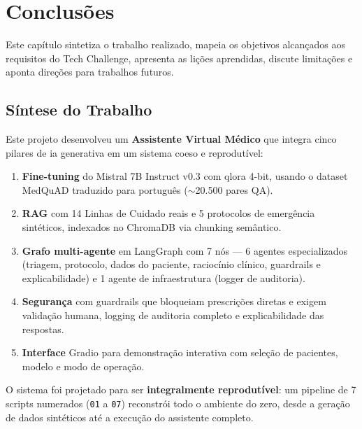 
\chapter{Conclusões}
\label{cap:conclusoes}

Este capítulo sintetiza o trabalho realizado, mapeia os objetivos alcançados aos requisitos do Tech Challenge, apresenta as lições aprendidas, discute limitações e aponta direções para trabalhos futuros.

\section{Síntese do Trabalho}
\label{sec:sintese}

Este projeto desenvolveu um \textbf{Assistente Virtual Médico} que integra cinco pilares de \acrshort{ia} generativa em um sistema coeso e reprodutível:

\begin{enumerate}
    \item \textbf{Fine-tuning} do Mistral 7B Instruct v0.3 com \acrshort{qlora} 4-bit, usando o dataset MedQuAD traduzido para português ($\sim$20.500 pares QA).
    \item \textbf{RAG} com 14 Linhas de Cuidado reais e 5 protocolos de emergência sintéticos, indexados no ChromaDB via chunking semântico.
    \item \textbf{Grafo multi-agente} em LangGraph com 7 nós --- 6 agentes especializados (triagem, protocolo, dados do paciente, raciocínio clínico, guardrails e explicabilidade) e 1 agente de infraestrutura (logger de auditoria).
    \item \textbf{Segurança} com guardrails que bloqueiam prescrições diretas e exigem validação humana, logging de auditoria completo e explicabilidade das respostas.
    \item \textbf{Interface} Gradio para demonstração interativa com seleção de pacientes, modelo e modo de operação.
\end{enumerate}

O sistema foi projetado para ser \textbf{integralmente reprodutível}: um pipeline de 7 scripts numerados (\texttt{01} a \texttt{07}) reconstrói todo o ambiente do zero, desde a geração de dados sintéticos até a execução do assistente completo.

